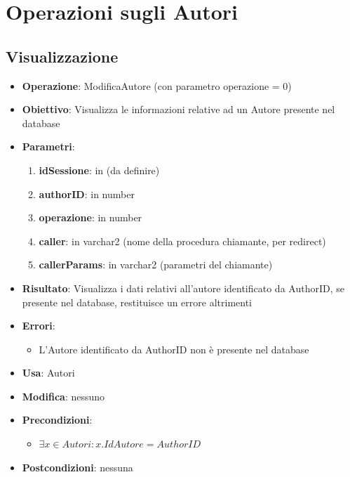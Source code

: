 \section{Operazioni sugli Autori}

\subsection{Visualizzazione}
\begin{itemize}
	\item \textbf{Operazione}: ModificaAutore (con parametro operazione = 0)
	\item \textbf{Obiettivo}: Visualizza le informazioni relative ad un Autore presente nel database
	\item \textbf{Parametri}:
	\begin{enumerate}
		\item \textbf{idSessione}: in (da definire)
		\item \textbf{authorID}: in number
		\item \textbf{operazione}: in number
		\item \textbf{caller}: in varchar2 (nome della procedura chiamante, per redirect)
		\item \textbf{callerParams}: in varchar2 (parametri del chiamante)
	\end{enumerate}
	\item \textbf{Risultato}: Visualizza i dati relativi all'autore identificato da AuthorID, se presente nel database, restituisce un errore altrimenti
	\item \textbf{Errori}: 
	\begin{itemize}
		\item L'Autore identificato da AuthorID non è presente nel database
	\end{itemize}
	\item \textbf{Usa}: Autori
	\item \textbf{Modifica}: nessuno
	\item \textbf{Precondizioni}:
	\begin{itemize}
		\item $\exists x \in Autori : x.IdAutore = AuthorID$
	\end{itemize}
	\item \textbf{Postcondizioni}: nessuna
\end{itemize}


